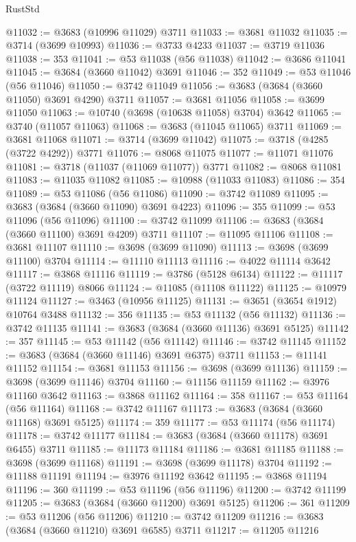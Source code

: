 \begin{lexlean}{RustStd}
\begin{coremodule}
{\begin{coremodule}
{{{{{{{{{{{{{{{{{{{{{{{{{{{{{{{{{{{{{{{{{{{{{{{@11032 := @3683 (@10996 @11029) @3711
@11033 := @3681 @11032
@11035 := @3714 (@3699 @10993)
@11036 := @3733 @4233
@11037 := @3719 @11036
@11038 := 353
@11041 := @53 @11038 (@56 @11038)
@11042 := @3686 @11041
@11045 := @3684 (@3660 @11042) @3691
@11046 := 352
@11049 := @53 @11046 (@56 @11046)
@11050 := @3742 @11049
@11056 := @3683 (@3684 (@3660 @11050) @3691 @4290) @3711
@11057 := @3681 @11056
@11058 := @3699 @11050
@11063 := @10740 (@3698 (@10638 @11058) @3704) @3642
@11065 := @3740 (@11057 @11063)
@11068 := @3683 (@11045 @11065) @3711
@11069 := @3681 @11068
@11071 := @3714 (@3699 @11042)
@11075 := @3718 (@4285 (@3722 @4292)) @3771
@11076 := @8068 @11075
@11077 := @11071 @11076
@11081 := @3718 (@11037 (@11069 @11077)) @3771
@11082 := @8068 @11081
@11083 := @11035 @11082
@11085 := @10988 (@11033 @11083)
@11086 := 354
@11089 := @53 @11086 (@56 @11086)
@11090 := @3742 @11089
@11095 := @3683 (@3684 (@3660 @11090) @3691 @4223)
@11096 := 355
@11099 := @53 @11096 (@56 @11096)
@11100 := @3742 @11099
@11106 := @3683 (@3684 (@3660 @11100) @3691 @4209) @3711
@11107 := @11095 @11106
@11108 := @3681 @11107
@11110 := @3698 (@3699 @11090)
@11113 := @3698 (@3699 @11100) @3704
@11114 := @11110 @11113
@11116 := @4022 @11114 @3642
@11117 := @3868 @11116
@11119 := @3786 (@5128 @6134)
@11122 := @11117 (@3722 @11119) @8066
@11124 := @11085 (@11108 @11122)
@11125 := @10979 @11124
@11127 := @3463 (@10956 @11125)
@11131 := @3651 (@3654 @1912) @10764 @3488
@11132 := 356
@11135 := @53 @11132 (@56 @11132)
@11136 := @3742 @11135
@11141 := @3683 (@3684 (@3660 @11136) @3691 @5125)
@11142 := 357
@11145 := @53 @11142 (@56 @11142)
@11146 := @3742 @11145
@11152 := @3683 (@3684 (@3660 @11146) @3691 @6375) @3711
@11153 := @11141 @11152
@11154 := @3681 @11153
@11156 := @3698 (@3699 @11136)
@11159 := @3698 (@3699 @11146) @3704
@11160 := @11156 @11159
@11162 := @3976 @11160 @3642
@11163 := @3868 @11162
@11164 := 358
@11167 := @53 @11164 (@56 @11164)
@11168 := @3742 @11167
@11173 := @3683 (@3684 (@3660 @11168) @3691 @5125)
@11174 := 359
@11177 := @53 @11174 (@56 @11174)
@11178 := @3742 @11177
@11184 := @3683 (@3684 (@3660 @11178) @3691 @6455) @3711
@11185 := @11173 @11184
@11186 := @3681 @11185
@11188 := @3698 (@3699 @11168)
@11191 := @3698 (@3699 @11178) @3704
@11192 := @11188 @11191
@11194 := @3976 @11192 @3642
@11195 := @3868 @11194
@11196 := 360
@11199 := @53 @11196 (@56 @11196)
@11200 := @3742 @11199
@11205 := @3683 (@3684 (@3660 @11200) @3691 @5125)
@11206 := 361
@11209 := @53 @11206 (@56 @11206)
@11210 := @3742 @11209
@11216 := @3683 (@3684 (@3660 @11210) @3691 @6585) @3711
@11217 := @11205 @11216
}}}}}}}}}}}}}}}}}}}}}}}}}}}}}}}}}}}}}}}}}}}}}}}
\end{coremodule}}
\end{coremodule}
\end{lexlean}
